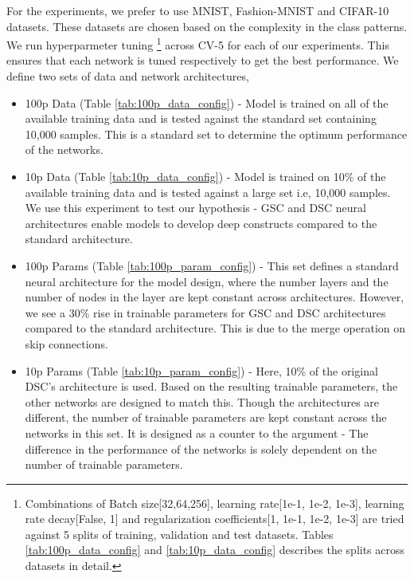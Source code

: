 \documentclass{article}
\begin{document}
For the experiments, we prefer to use MNIST, Fashion-MNIST and CIFAR-10 datasets. These datasets are chosen based on the complexity in the class patterns. We run hyperparmeter tuning \footnote{Combinations of Batch size[32,64,256], learning rate[1e-1, 1e-2, 1e-3], learning rate decay[False, 1] and regularization coefficients[1, 1e-1, 1e-2, 1e-3] are tried against 5 splits of training, validation and test datasets. Tables \ref{tab:100p_data_config} and \ref{tab:10p_data_config} describes the splits across datasets in detail. } across CV-5 for each of our experiments. This ensures that each network is tuned respectively to get the best performance. We define two sets of data and network architectures,
\begin{itemize}
\item 100p Data (Table \ref{tab:100p_data_config}) - Model is trained on all of the available training data and is tested against the standard set containing 10,000 samples. This is a standard set to determine the optimum performance of the networks.
\item 10p Data (Table \ref{tab:10p_data_config}) - Model is trained on 10\% of the available training data and is tested against a large set i.e, 10,000 samples. We use this experiment to test our hypothesis - GSC and DSC neural architectures enable models to develop deep constructs compared to the standard architecture.
\item 100p Params (Table \ref{tab:100p_param_config}) - This set defines a standard neural architecture for the model design, where the number layers and the number of nodes in the layer are kept constant across architectures. However, we see a 30\% rise in trainable parameters for GSC and DSC architectures compared to the standard architecture. This is due to the merge operation on skip connections.
\item 10p Params (Table \ref{tab:10p_param_config}) - Here, 10\% of the original DSC's architecture is used. Based on the resulting trainable parameters, the other networks are designed to match this. Though the architectures are different, the number of trainable parameters are kept constant across the networks in this set. It is designed as a counter to the argument - The difference in the performance of the networks is solely dependent on the number of trainable parameters.
\end{itemize}
\end{document}
